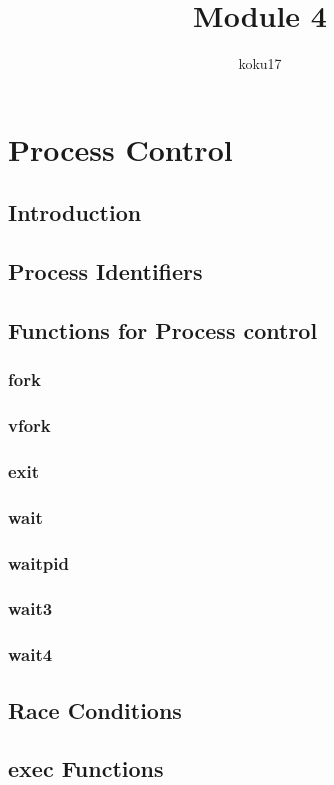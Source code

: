 \documentclass{article}
\author{koku17}
\title{Module 4}
\begin{document}
     \maketitle \newpage
     \tableofcontents \newpage
	\section{Process Control}
	\subsection{Introduction}
	\subsection{Process Identifiers}
	\subsection{Functions for Process control}
	\subsubsection{fork}
	\subsubsection{vfork}
	\subsubsection{exit}
	\subsubsection{wait}
	\subsubsection{waitpid}
	\subsubsection{wait3}
	\subsubsection{wait4}
	\subsection{Race Conditions}
	\subsection{exec Functions}
	
\end{document}
